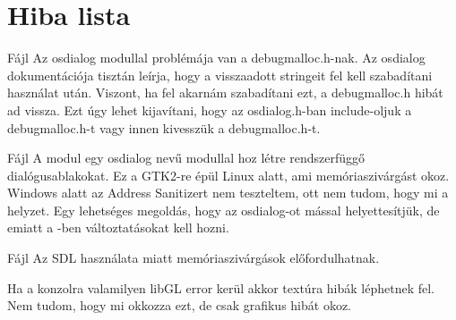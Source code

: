 \chapter{Hiba lista}
\hypertarget{bug}{}\label{bug}

\begin{DoxyRefList}
\item[Fájl \doxylink{game_8c}{game.c} ]\label{bug__bug000004}%
%
Az osdialog modullal problémája van a debugmalloc.\+h-\/nak. Az osdialog dokumentációja tisztán leírja, hogy a visszaadott stringeit fel kell szabadítani használat után. Viszont, ha fel akarnám szabadítani ezt, a debugmalloc.\+h hibát ad vissza. Ezt úgy lehet kijavítani, hogy az osdialog.\+h-\/ban include-\/oljuk a debugmalloc.\+h-\/t vagy innen kivesszük a debugmalloc.\+h-\/t.  
\item[Fájl \doxylink{game_8h}{game.h} ]\label{bug__bug000001}%
%
A modul egy osdialog nevű modullal hoz létre rendszerfüggő dialógusablakokat. Ez a GTK2-\/re épül Linux alatt, ami memóriaszivárgást okoz. Windows alatt az Address Sanitizert nem teszteltem, ott nem tudom, hogy mi a helyzet. Egy lehetséges megoldás, hogy az osdialog-\/ot mással helyettesítjük, de emiatt a -\/ben változtatásokat kell hozni.  
\item[Fájl \doxylink{SDL__local_8h}{SDL\+\_\+local.h} ]\label{bug__bug000002}%
%
Az SDL használata miatt memóriaszivárgások előfordulhatnak.

\label{bug__bug000003}%
%
Ha a konzolra valamilyen lib\+GL error kerül akkor textúra hibák léphetnek fel. Nem tudom, hogy mi okkozza ezt, de csak grafikus hibát okoz. 
\end{DoxyRefList}